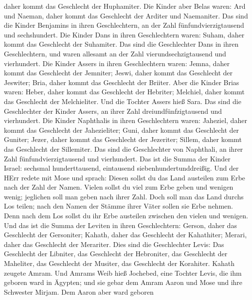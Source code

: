 daher kommt das Geschlecht der Huphamiter.  Die Kinder aber
Belas waren: Ard und Naeman, daher kommt das Geschlecht der Arditer und
Naemaniter.  Das sind die Kinder Benjamins in ihren
Geschlechtern, an der Zahl fünfundvierzigtausend und sechshundert.
 Die Kinder Dans in ihren Geschlechtern waren: Suham, daher
kommt das Geschlecht der Suhamiter.  Das sind die
Geschlechter Dans in ihren Geschlechtern, und waren allesamt an der Zahl
vierundsechzigtausend und vierhundert.  Die Kinder Assers
in ihren Geschlechtern waren: Jemna, daher kommt das Geschlecht der
Jemniter; Jeswi, daher kommt das Geschlecht der Jeswiter; Bria, daher
kommt das Geschlecht der Briiter.  Aber die Kinder Brias
waren: Heber, daher kommt das Geschlecht der Hebriter; Melchiel, daher
kommt das Geschlecht der Melchieliter.  Und die Tochter
Assers hieß Sara.  Das sind die Geschlechter der Kinder
Assers, an ihrer Zahl dreiundfünfzigtausend und vierhundert.
 Die Kinder Naphthalis in ihren Geschlechtern waren:
Jaheziel, daher kommt das Geschlecht der Jahezieliter; Guni, daher kommt
das Geschlecht der Guniter;  Jezer, daher kommt das
Geschlecht der Jezeriter; Sillem, daher kommt das Geschlecht der
Sillemiter.  Das sind die Geschlechter von Naphthali, an
ihrer Zahl fünfundvierzigtausend und vierhundert.  Das ist
die Summa der Kinder Israel: sechsmal hunderttausend, eintausend
siebenhundertunddreißig.  Und der HErr redete mit Mose und
sprach:  Diesen sollst du das Land austeilen zum Erbe nach
der Zahl der Namen.  Vielen sollst du viel zum Erbe geben
und wenigen wenig; jeglichen soll man geben nach ihrer Zahl.
 Doch soll man das Land durchs Los teilen; nach den Namen
der Stämme ihrer Väter sollen sie Erbe nehmen.  Denn nach
dem Los sollst du ihr Erbe austeilen zwischen den vielen und wenigen.
 Und das ist die Summa der Leviten in ihren Geschlechtern:
Gerson, daher das Geschlecht der Gersoniter; Kahath, daher das
Geschlecht der Kahathiter; Merari, daher das Geschlecht der Merariter.
 Dies sind die Geschlechter Levis: Das Geschlecht der
Libniter, das Geschlecht der Hebroniter, das Geschlecht der Maheliter,
das Geschlecht der Musiter, das Geschlecht der Korahiter. Kahath zeugete
Amram.  Und Amrams Weib hieß Jochebed, eine Tochter Levis,
die ihm geboren ward in Ägypten; und sie gebar dem Amram Aaron und Mose
und ihre Schwester Mirjam.  Dem Aaron aber ward geboren
